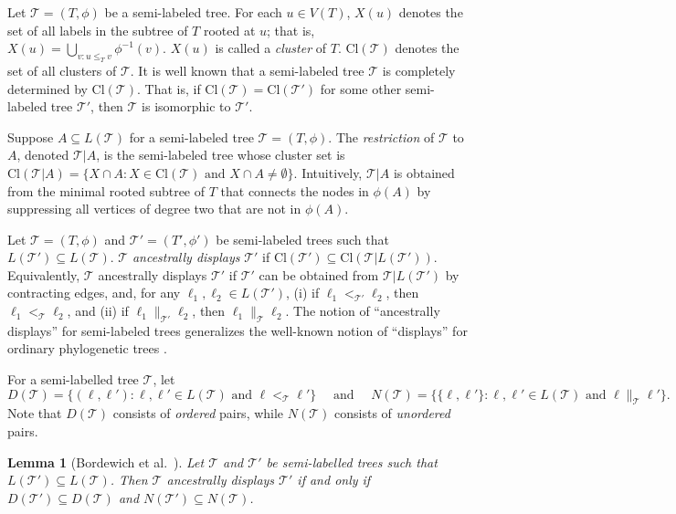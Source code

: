 \documentclass[11pt]{article}
\newcommand{\Cl}{\ensuremath{{\mathrm{Cl}}}} 		\newcommand{\true}{{\ensuremath{\texttt{true}}}}
\newcommand{\T}{\ensuremath{\mathcal{T}}}
\newtheorem{lemma}{Lemma}
\theoremstyle{definition}
\begin{document}
Let  $\T = (T,\phi)$ be a semi-labeled tree. For each $u \in V(T)$,  $X(u)$ denotes the set of all labels in the subtree of $T$ rooted at $u$; that is, $X(u) = \bigcup_{v: u \le_T v} \phi^{-1}(v)$. $X(u)$ is called a \emph{cluster} of $T$.  
$\Cl(\T)$ denotes the set of all clusters of $\T$.   It is well known \cite[Theorem 3.5.2]{SempleSteel03} that a semi-labeled tree $\T$ is completely determined by $\Cl(\T )$.  That is, if $\Cl(\T) = \Cl(\T')$ for some other semi-labeled tree $\T'$, then $\T$ is isomorphic to $\T'$.



Suppose $A \subseteq L(\T)$ for a semi-labeled tree $\T = (T,\phi)$.  The \emph{restriction} of $\T$ to $A$, denoted $\T |A$, is the semi-labeled tree whose cluster set is
$\Cl(\T | A) = \{X \cap A : X \in \Cl(\T) \text{ and } X \cap A \neq \emptyset \}.$
Intuitively, $\T | A$ is obtained from the minimal rooted subtree of $T$ that connects the nodes in $\phi(A)$ by suppressing all vertices of degree two that are not in $\phi(A)$.

Let $\T = (T,\phi)$ and $\T' = (T', \phi')$ be semi-labeled trees such that $L(\T') \subseteq L(\T)$.  $\T$  \emph{ancestrally displays} $\T'$ if $\Cl(\T') \subseteq \Cl(\T|L(\T'))$.  Equivalently, $\T$ ancestrally displays $\T'$ if $\T'$  can be obtained from $\T | L(\T')$ by contracting edges, and, for any $\ell_1, \ell_2 \in L(\T')$, (i) if $\ell_1 <_\mathcal{\T'} \ell_2$, then $\ell_1 <_\T \ell_2$, and
(ii)
if $\ell_1 \parallel_\mathcal{\T'} \ell_2$, then $\ell_1 \parallel_\mathcal{\T} \ell_2$.
The notion of ``ancestrally displays'' for semi-labeled trees generalizes the well-known notion of ``displays'' for ordinary phylogenetic trees \cite{SempleSteel03}.  





For a semi-labelled tree $\T$, let
\begin{equation}
D(\T) = \{(\ell,\ell'): \ell, \ell' \in L(\T) \text{ and } \ell <_\T \ell'\} \quad \text{ and } \quad
N(\T ) = \{\{\ell,\ell'\} : \ell, \ell' \in L(\T) \text{ and } \ell \parallel_\T \ell'\}.
\end{equation}
Note that $D(\T)$ consists of \emph{ordered} pairs, while $N(\T)$ consists of \emph{unordered} pairs.

\begin{lemma}[Bordewich et al.\  \cite{BordewichEvansSemple2006}]\label{lm:DN}
Let $\T$ and $\T'$ be semi-labelled trees such that $L(\T') \subseteq L(\T)$. Then $\T$ ancestrally displays $\T'$ if and only if $D(\T') \subseteq D(\T)$ and $N(\T') \subseteq N(\T)$.
\end{lemma}
\end{document}
